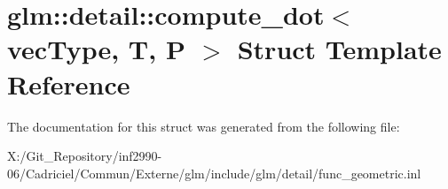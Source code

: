 \hypertarget{structglm_1_1detail_1_1compute__dot}{\section{glm\-:\-:detail\-:\-:compute\-\_\-dot$<$ vec\-Type, T, P $>$ Struct Template Reference}
\label{structglm_1_1detail_1_1compute__dot}
}


The documentation for this struct was generated from the following file\-:\begin{DoxyCompactItemize}
\item 
X\-:/\-Git\-\_\-\-Repository/inf2990-\/06/\-Cadriciel/\-Commun/\-Externe/glm/include/glm/detail/func\-\_\-geometric.\-inl\end{DoxyCompactItemize}
